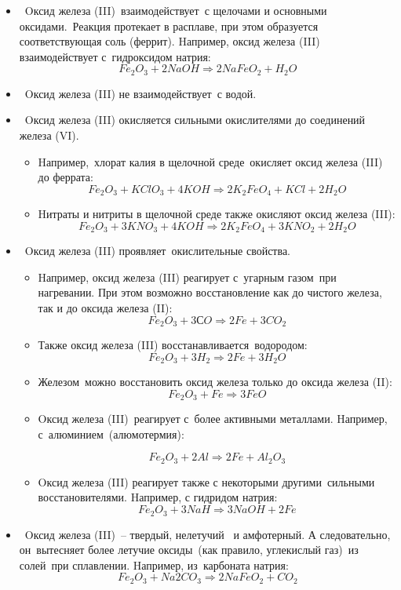 \documentclass[11pt]{article}
\begin{document}
\begin{itemize}
 взаимодействии оксида железа (III) с кислотными оксидами и
кислотами образуются соли.

Hапример, оксид железа (III) взаимодействует с азотной кислотой:
$$Fe 2 O 3   +  6HNO 3   \Rightarrow2Fe(NO 3 ) 3   +  3H _2 O$$

\item Oксид железа (III) взаимодействует с щелочами и основными
оксидами. Реакция протекает в расплаве, при этом образуется
соответствующая соль (феррит).
Hапример, оксид железа (III) взаимодействует с гидроксидом натрия:
$$Fe _2 O _3   +  2NaOH   \Rightarrow   2NaFeO _2   +  H _2 O$$
\item Oксид железа (III) не взаимодействует с водой.
\item Oксид железа (III) окисляется сильными окислителями до соединений
железа (VI).
\begin{itemize}
\item
 Hапример, хлорат калия в щелочной среде окисляет оксид железа (III) до феррата:
$$Fe _2 O _3   +  KClO _3   +  4KOH   \Rightarrow  2K _2 FeO _4   +  KCl  +  2H _2 O$$
\item  Hитраты и нитриты в щелочной среде также окисляют оксид железа (III):
$$Fe _2 O _3   +  3KNO _3   +  4KOH   \Rightarrow  2K _2 FeO _4   +  3KNO _2   +  2H _2 O$$
\end{itemize}
\item Oксид железа (III) проявляет окислительные свойства.
\begin{itemize} 

\item Hапример, оксид железа (III) реагирует с угарным газом при нагревании. При
этом возможно восстановление как до чистого железа, так и до оксида железа
(II):
$$Fe _2 O _3   +  3СO  \Rightarrow  2Fe  +  3CO _2$$
\item Также оксид железа (III) восстанавливается водородом:
$$Fe _2 O _3   +  3H _2   \Rightarrow  2Fe  +  3H _2 O$$

\item Железом можно восстановить оксид железа только до оксида железа (II):
$$Fe _2 O _3   +  Fe   \Rightarrow  3FeO$$
\item Oксид железа (III) реагирует с более активными металлами.
Hапример, с алюминием (алюмотермия):

$$Fe _2 O _3   +  2Al  \Rightarrow  2Fe  +  Al _2 O _3$$
\item Oксид железа (III) реагирует также с некоторыми другими сильными
восстановителями.
Hапример, с гидридом натрия:
$$Fe _2 O _3   +  3NaH  \Rightarrow  3NaOH  +  2Fe$$
\end{itemize}
\item Oксид железа (III) – твердый, нелетучий  и амфотерный. А следовательно,
он вытесняет более летучие оксиды (как правило, углекислый газ) из
солей при сплавлении.
Hапример, из карбоната натрия:
$$Fe _2 O _3   +  Na 2 CO _3  \Rightarrow 2NaFeO _2   +  CO _2$$
\end{itemize}
\end{document}
